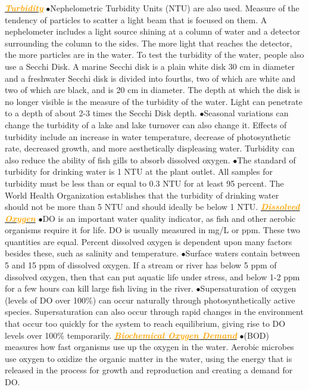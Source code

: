 \documentclass{article}
\newcommand{\ddd}{$\bullet$}
\newcommand{\orange}[1]{\textcolor{orange}{#1}}
\newcommand{\mysubsection}[1]{\underline{\textbf{{\textit{\orange{#1}}}}}}
\begin{document}
\begin{multicols*}{4}
        \mysubsection{Turbidity}
            \ddd Nephelometric Turbidity Units (NTU) are also used. Measure of the tendency of particles to scatter a light beam that is focused on them. A nephelometer includes a light source shining at a column of water and a detector surrounding the column to the sides. The more light that reaches the detector, the more particles are in the water. To test the turbidity of the water, people also use a Secchi Disk. A marine Secchi disk is a plain white disk 30 cm in diameter and a freshwater Secchi disk is divided into fourths, two of which are white and two of which are black, and is 20 cm in diameter. The depth at which the disk is no longer visible is the measure of the turbidity of the water. Light can penetrate to a depth of about 2-3 times the Secchi Disk depth. 
            \ddd Seasonal variations can change the turbidity of a lake and lake turnover can also change it. Effects of turbidity include an increase in water temperature, decrease of photosynthetic rate, decreased growth, and more aesthetically displeasing water. Turbidity can also reduce the ability of fish gills to absorb dissolved oxygen. 
            \ddd The standard of turbidity for drinking water is 1 NTU at the plant outlet. All samples for turbidity must be less than or equal to 0.3 NTU for at least 95 percent. The World Health Organization establishes that the turbidity of drinking water should not be more than 5 NTU and should ideally be below 1 NTU. 
        \mysubsection{Dissolved Oxygen}
            \ddd DO is an important water quality indicator, as fish and other aerobic organisms require it for life. DO is usually measured in mg/L or ppm. These two quantities are equal. Percent dissolved oxygen is dependent upon many factors besides these, such as salinity and temperature.
            \ddd Surface waters contain between 5 and 15 ppm of dissolved oxygen. If a stream or river has below 5 ppm of dissolved oxygen, then that can put aquatic life under stress, and below 1-2 ppm for a few hours can kill large fish living in the river.
            \ddd Supersaturation of oxygen (levels of DO over 100\%) can occur naturally through photosynthetically active species. Supersaturation can also occur through rapid changes in the environment that occur too quickly for the system to reach equilibrium, giving rise to DO levels over 100\% temporarily. 
        \mysubsection{Biochemical Oxygen Demand}
            \ddd (BOD) measures how fast organisms use up the oxygen in the water. Aerobic microbes use oxygen to oxidize the organic matter in the water, using the energy that is released in the process for growth and reproduction and creating a demand for DO.

\end{multicols*}
\end{document}

